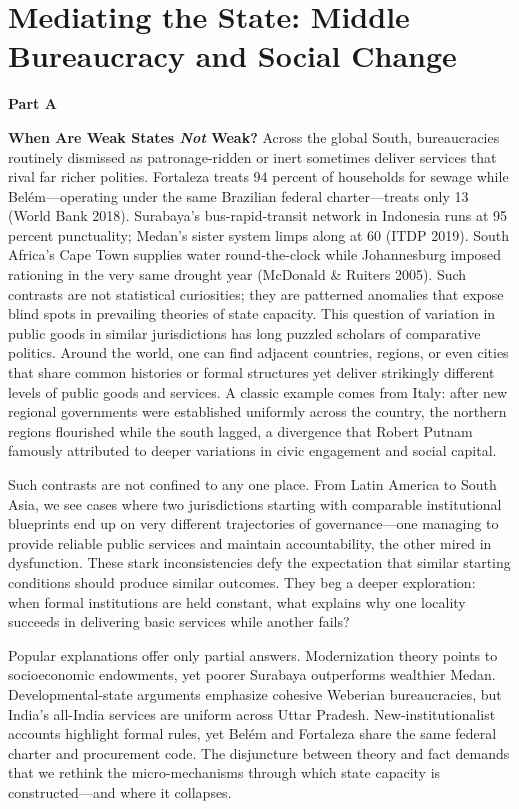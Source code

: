 \chapter{Mediating the State: Middle Bureaucracy and Social Change}
\setcounter{section}{0}
\setcounter{subsection}{1}
\renewcommand{\thesection}{\arabic{section}}

\bigskip
\noindent\textbf{Part A}\medskip

\noindent\textbf{When Are Weak States \emph{Not} Weak?}
\noindent Across the global South, bureaucracies routinely dismissed as patronage-ridden or inert sometimes deliver services that rival far richer polities. Fortaleza treats 94 percent of households for sewage while Belém—operating under the same Brazilian federal charter—treats only 13 (World Bank 2018). Surabaya’s bus-rapid-transit network in Indonesia runs at 95 percent punctuality; Medan’s sister system limps along at 60 (ITDP 2019). South Africa’s Cape Town supplies water round-the-clock while Johannesburg imposed rationing in the very same drought year (McDonald & Ruiters 2005). Such contrasts are not statistical curiosities; they are patterned anomalies that expose blind spots in prevailing theories of state capacity. This question of variation in public goods in similar jurisdictions has long puzzled scholars of comparative politics. Around the world, one can find adjacent countries, regions, or even cities that share common histories or formal structures yet deliver strikingly different levels of public goods and services. A classic example comes from Italy: after new regional governments were established uniformly across the country, the northern regions flourished while the south lagged, a divergence that Robert Putnam 
\citeyear{putnam_making_1994} famously attributed to deeper variations in civic engagement and social capital.

Such contrasts are not confined to any one place. From Latin America to South Asia, we see cases where two jurisdictions starting with comparable institutional blueprints end up on very different trajectories of governance—one managing to provide reliable public services and maintain accountability, the other mired in dysfunction. These stark inconsistencies defy the expectation that similar starting conditions should produce similar outcomes. They beg a deeper exploration: when formal institutions are held constant, what explains why one locality succeeds in delivering basic services while another fails?

Popular explanations offer only partial answers. Modernization theory points to socioeconomic endowments, yet poorer Surabaya outperforms wealthier Medan. Developmental-state arguments emphasize cohesive Weberian bureaucracies, but India’s all-India services are uniform across Uttar Pradesh. New-institutionalist accounts highlight formal rules, yet Belém and Fortaleza share the same federal charter and procurement code. The disjuncture between theory and fact demands that we rethink the micro-mechanisms through which state capacity is constructed—and where it collapses.

